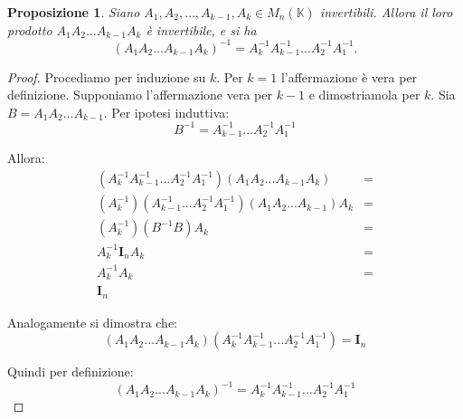 \documentclass{article}
\theoremstyle{plain}
\newtheorem{prop}[thm]{Proposizione}
\theoremstyle{definition}
\theoremstyle{remark}
\begin{document}
\begin{bxthm}
\begin{prop}
    Siano \( A_1,A_2, \ldots,A_{k-1}, A_k \in M_n(\mathbb{K}) \) invertibili. Allora il loro prodotto \( A_1A_2 \ldots A_{k-1} A_k \) è invertibile, e si ha
    \[(A_1A_2 \ldots A_{k-1} A_k)^{-1} = A_k^{-1}A_{k-1}^{-1} \ldots A_2^{-1} A_1^{-1}.\]
\end{prop}
\end{bxthm}
\begin{proof}
    Procediamo per induzione su $k$.
    Per $k=1$ l'affermazione è vera per definizione.
    Supponiamo l'affermazione vera per $k-1$ e dimostriamola per $k$.
    Sia $B = A_1A_2...A_{k-1}$. Per ipotesi induttiva:
    \[ B^{-1} = A_{k-1}^{-1}...A_2^{-1}A_1^{-1} \]
    
    Allora:
    \begin{align*}
        (A_k^{-1}A_{k-1}^{-1}...A_2^{-1}A_1^{-1})(A_1A_2...A_{k-1}A_k) &= \\
        (A_k^{-1})(A_{k-1}^{-1}...A_2^{-1}A_1^{-1})(A_1A_2...A_{k-1})A_k &= \\
        (A_k^{-1})(B^{-1}B)A_k &= \\
        A_k^{-1}\mathbf{I}_nA_k &= \\
        A_k^{-1}A_k &= \\
        \mathbf{I}_n
    \end{align*}

    Analogamente si dimostra che:
    \[ (A_1A_2...A_{k-1}A_k)(A_k^{-1}A_{k-1}^{-1}...A_2^{-1}A_1^{-1}) = \mathbf{I}_n \]

    Quindi per definizione:
    \[ (A_1A_2...A_{k-1}A_k)^{-1} = A_k^{-1}A_{k-1}^{-1}...A_2^{-1}A_1^{-1} \]
\end{proof}
\end{document}
